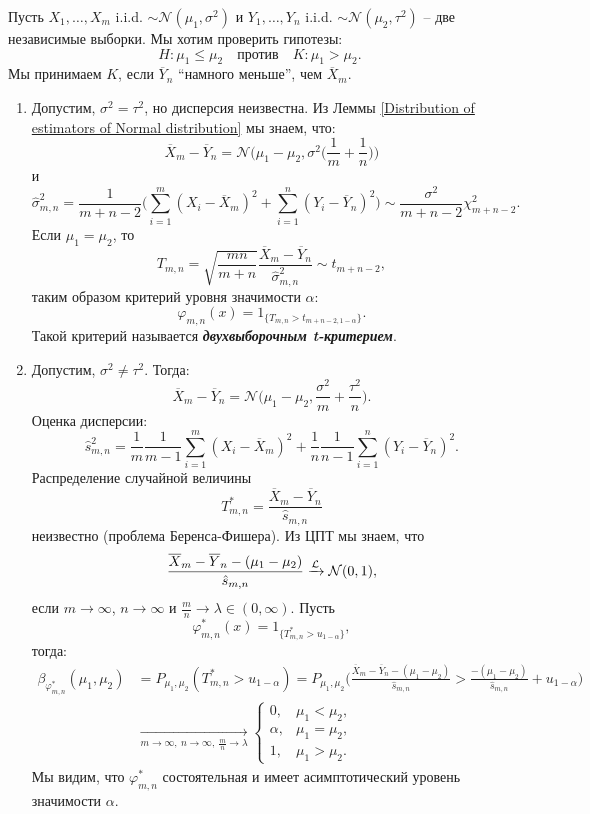 \begin{exmp}
	Пусть $X_1, \dots , X_m$ i.i.d. $\sim \mathcal{N}(\mu_1, \sigma^2)$ и $Y_1, \dots , Y_n$ i.i.d. $\sim \mathcal{N}(\mu_2, \tau^2)$ -- две независимые выборки. Мы хотим проверить гипотезы:
	\[H: \mu_1 \leq \mu_2 \quad \text{против} \quad K: \mu_1 > \mu_2. \]
	Мы принимаем $K$, если $\overline{Y}_n$ ``намного меньше'', чем $\overline{X}_m$.
	\begin{enumerate}
		\item Допустим, $\sigma^2=\tau^2$, но дисперсия неизвестна. Из Леммы \ref{Distribution of estimators of Normal distribution} мы знаем, что:
		\[ \overline{X}_m - \overline{Y}_n=\mathcal{N}\bigg(\mu_1-\mu_2, \sigma^2\bigg( \frac{1}{m}+\frac{1}{n} \bigg)\bigg) \]
		и
		\[ \hat{\sigma}_{m,n}^2=\frac{1}{m+n-2}\Big( \sum_{i=1}^{m}(X_i-\overline{X}_m)^2+\sum_{i=1}^{n}(Y_i-\overline{Y}_n)^2 \Big) \sim \frac{\sigma^2}{m+n-2} \chi_{m+n-2}^2. \]	
		Если $\mu_1=\mu_2$, то 
		\[ T_{m,n}=\sqrt{\frac{mn}{m+n}}\frac{\overline{X}_m-\overline{Y}_n}{\hat{\sigma}_{m,n}^2} \sim t_{m+n-2}, \]	
		таким образом критерий уровня значимости $\alpha$:
		\[ \varphi_{m,n}(x)=1_{\{T_{m,n} > t_{m+n-2, 1-\alpha}\}}. \]
		Такой критерий называется \textbf{\textit{двухвыборочным t-критерием}}.
		\item Допустим, $\sigma^2 \neq \tau^2$. Тогда:
		\[ \overline{X}_m - \overline{Y}_n=\mathcal{N}\bigg(\mu_1-\mu_2, \frac{\sigma^2}{m}+\frac{\tau^2}{n} \bigg). \]
		Оценка дисперсии:
		\[ \hat{s}_{m,n}^2=\frac{1}{m}\frac{1}{m-1}\sum_{i=1}^{m}(X_i-\overline{X}_m)^2+\frac{1}{n}\frac{1}{n-1}\sum_{i=1}^{n}(Y_i-\overline{Y}_n)^2. \]
		Распределение случайной величины
		\[ T_{m,n}^*=\frac{\overline{X}_m-\overline{Y}_n}{\hat{s}_{m,n}} \]
		неизвестно (проблема Беренса-Фишера). Из ЦПТ мы знаем, что
		\[ \frac{\overline{X}_m-\overline{Y}_n - (\mu_1-\mu_2)}{\hat{s}_{m,n}} \xrightarrow{\mathcal{L}} \mathcal{N}(0,1), \]
		если $m \rightarrow \infty$, $n \rightarrow \infty$ и $\frac{m}{n}\rightarrow \lambda \in (0, \infty)$. Пусть
		\[ \varphi_{m,n}^*(x)=1_{\{T_{m,n}^* > u_{1-\alpha}\}}, \]
		тогда:
		\[ \begin{aligned}
		 \beta_{\varphi_{m,n}^*}(\mu_1, \mu_2) & =P_{\mu_1, \mu_2}(T_{m,n}^* > u_{1-\alpha})=P_{\mu_1, \mu_2}\Big(\frac{\overline{X}_m-\overline{Y}_n - (\mu_1-\mu_2)}{\hat{s}_{m,n}} >\frac{- (\mu_1-\mu_2)}{\hat{s}_{m,n}}+ u_{1-\alpha}\Big) \\
		  & \xrightarrow[m \rightarrow \infty,\ n \rightarrow \infty,\ \frac{m}{n}\rightarrow \lambda]{}
		 \left \{
		 \begin{array}{cl}
		 0, & \mu_1 < \mu_2, \\
		  \alpha, & \mu_1=\mu_2, \\
		  1, & \mu_1>\mu_2.
		 \end{array}
		 \right.
		 \end{aligned} \]
		 Мы видим, что $\varphi_{m,n}^*$ состоятельная и имеет асимптотический уровень значимости $\alpha$.
	\end{enumerate}
\end{exmp}

